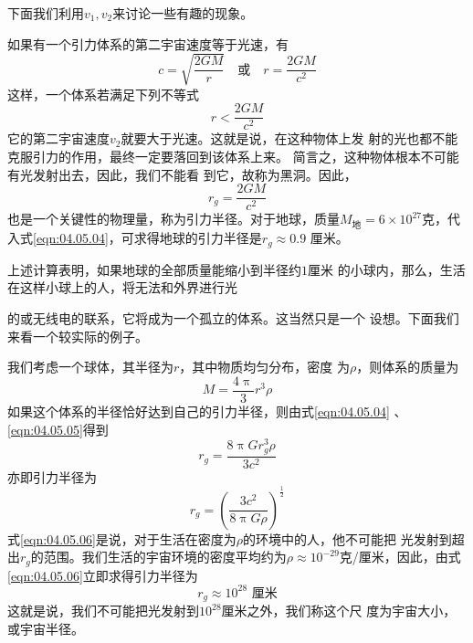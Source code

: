 下面我们利用$  v _ 1 , v _ 2 $来讨论一些有趣的现象。

如果有一个引力体系的第二宇宙速度等于光速，有
\begin{equation*}
  c = \sqrt { \frac { 2 G M } { r } } \quad
  \text{或} \quad
  r = \frac { 2 G M } { c ^ { 2 } }
\end{equation*}
这样，一个体系若满足下列不等式
\begin{equation*}
  r < \frac { 2 G M } { c ^ { 2 } }
\end{equation*}
它的第二宇宙速度$ v_2 $就要大于光速。这就是说，在这种物体上发
射的光也都不能克服引力的作用，最终一定要落回到该体系上来。
简言之，这种物体根本不可能有光发射出去，因此，我们不能看
到它，故称为黑洞。因此，
\begin{equation}\label{eqn:04.05.04}
  r _ { g } = \frac { 2 G M } { c ^ { 2 } }
\end{equation}
也是一个关键性的物理量，称为引力半径。对于地球，质量$ M _ { \text{地} }= 6 \times 1 0 ^ { 2 7 }  $克，代入式\eqref{eqn:04.05.04}，可求得地球的引力半径是$  r _ { g } \approx 0 . 9  $
厘米。

上述计算表明，如果地球的全部质量能缩小到半径约$ 1 $厘米
的小球内，那么，生活在这样小球上的人，将无法和外界进行光

\clearpage\noindent
的或无线电的联系，它将成为一个孤立的体系。这当然只是一个
设想。下面我们来看一个较实际的例子。

我们考虑一个球体，其半径为$ r $，其中物质均匀分布，密度
为$ \rho $，则体系的质量为
\begin{equation}\label{eqn:04.05.05}
  M = \frac { 4 \uppi } { 3 } r ^ { 3 } \rho
\end{equation}
如果这个体系的半径恰好达到自己的引力半径，则由式\eqref{eqn:04.05.04} 、\eqref{eqn:04.05.05}得到
\begin{equation*}
  r _ { g } = \frac { 8 \uppi G r _ { g } ^ { 3 } \rho } { 3 c ^ { 2 } }
\end{equation*}
亦即引力半径为
\begin{equation}\label{eqn:04.05.06}
  r _ { g } = \left( \frac { 3 c ^ { 2 } } { 8 \uppi G \rho } \right) ^ { \frac { 1 } { 2 } }
\end{equation}
式\eqref{eqn:04.05.06}是说，对于生活在密度为$ \rho $的环境中的人，他不可能把
光发射到超出$ r_g $的范围。我们生活的宇宙环境的密度平均约为$ \rho
  \approx 10 ^ {-29}$克/厘米，因此，由式\eqref{eqn:04.05.06}立即求得引力半径为
\begin{equation*}
  r _ g \approx 10 ^ {28}\text{ 厘米}
\end{equation*}
这就是说，我们不可能把光发射到$ 10 ^ {28} $厘米之外，我们称这个尺
度为宇宙大小，或宇宙半径。